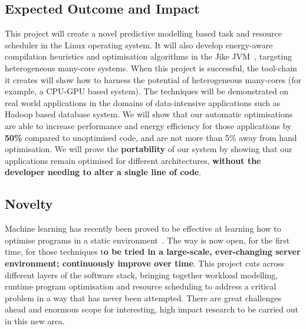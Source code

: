 \subsection{Expected Outcome and Impact}
This project will create a novel predictive modelling based task and resource scheduler in the Linux operating system. It will also develop energy-aware compilation heuristics and optimisation algorithms in the Jike JVM~\cite{}, targeting heterogeneous many-core systems.
When this project  is successful, the tool-chain it creates will show how to harness the potential of heterogeneous many-cores (for example, a CPU-GPU based system). The techniques will be demonstrated on real world applications in the domains of data-intensive applications such as Hadoop based  database system. We will show that our automatic optimisations are able to increase performance and energy efficiency for those applications by \textbf{50\%} compared to unoptimised code, and are not more than 5\% away from hand optimisation. We will prove the \textbf{portability} of our system by showing that our applications remain optimised for different architectures, \textbf{without the developer needing to alter a single line of code}.

\subsection{Novelty}
Machine learning has recently been proved to be effective at learning how to optimise programs in a static environment~\cite{wangf,wangs}. The way is now open, for the first time, for those techniques t\textbf{o be tried in a large-scale, ever-changing server environment; continuously improve over time}. This project cuts across different layers of the software stack, bringing together workload modelling, runtime program optimisation and resource scheduling to address a critical problem in a way that has never been attempted. There are great challenges ahead and enormous scope for interesting, high impact research to be carried out in this new area.

